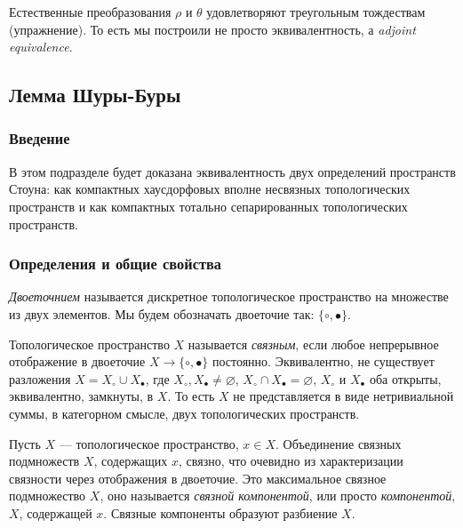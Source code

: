 \documentclass[
	extrafontsizes,
	11pt,
	hyphens,
]{memoir}
\begin{document}
\begin{remark}
Естественные преобразования $\rho$ и $\theta$ удовлетворяют треугольным тождествам (упражнение). То есть мы построили не просто эквивалентность, а \textenglish{\emph{adjoint equivalence}}.
\end{remark}

\subsection{Лемма Шуры-Буры}

\subsubsection{Введение}

В этом подразделе будет доказана эквивалентность двух определений пространств Стоуна: как компактных хаусдорфовых впол\-не несвязных топологических пространств и как компактных тотально сепарированных топологических пространств.

\subsubsection{Определения и общие свойства}

\begin{definition}
\emph{Двоеточнием} называется дискретное топологическое пространство на множестве из двух элементов. Мы будем обозначать двоеточие так: $\{\circ,\bullet\}$.
\end{definition}

\begin{definition}
Топологическое пространство $X$ называется \emph{связным}, если любое непрерывное отображение в двоеточие $X \to \{\circ,\bullet\}$ постоянно. Эквивалентно, не существует разложения $X = X_\circ \cup X_\bullet$, где $X_\circ,X_\bullet \neq \varnothing$, $X_\circ \cap X_\bullet = \varnothing$, $X_\circ$ и $X_\bullet$ оба открыты, эквивалентно, замкнуты, в $X$.
То есть $X$ не представляется в виде нетривиальной суммы, в категорном смысле, двух топологических пространств.
\end{definition}

\begin{definition}
Пусть $X$ --- топологическое пространство, $x \in X$. Объединение связных подмножеств $X$, содержащих $x$, связно, что очевидно из характеризации связности через отображения в двоеточие. Это максимальное связное подмножество $X$, оно называется \emph{связной компонентой}, или просто \emph{компонентой}, $X$, содержащей $x$. Связные компоненты образуют разбиение $X$.
\end{definition}
\end{document}
